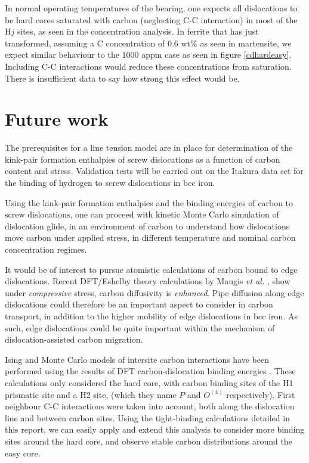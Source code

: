 \documentclass[a4paper,11pt]{article}
\begin{document}
In normal operating temperatures of the bearing, one expects all dislocations to be hard cores
saturated with carbon (neglecting C-C interaction) in most of the \(\text{H}j\) sites, as seen in
the concentration analysis. In ferrite that has just transformed, assuming a C concentration of
0.6 wt\% as seen in martensite, we expect similar behaviour to the 1000 appm case as seen in
figure \ref{cdhardeasy}. Including C-C interactions would reduce these concentrations from
saturation. There is insufficient data to say how strong this effect would be.



\section{Future work}
\label{sec:org74cf1cf}

The prerequisites for a line tension model are in place for determination of the kink-pair
formation enthalpies of screw dislocations as a function of carbon content and stress. Validation
tests will be carried out on the Itakura data set for the binding of hydrogen to screw
dislocations in bcc iron. 


Using the kink-pair formation enthalpies and the binding energies of carbon to screw dislocations, one can proceed
with kinetic Monte Carlo simulation of dislocation glide, in an environment of carbon to
understand how dislocations move carbon under applied stress, in different temperature
and nominal carbon concentration regimes.


It would be of interest to pursue atomistic calculations of carbon bound to edge
dislocations. Recent DFT/Eshelby theory calculations by Maugis \emph{et al.} \cite{Maugis2020}, show
under \emph{compressive} stress, carbon diffusivity is \emph{enhanced}. Pipe diffusion along edge
dislocations could therefore be an important aspect to consider in carbon transport, in addition
to the higher mobility of edge dislocations in bcc iron. As such, edge dislocations could be quite
important within the mechanism of dislocation-assisted carbon migration.

Ising and Monte Carlo models of intersite carbon interactions have been performed using the
results of DFT carbon-dislocation binding energies \cite{Lthi2019}.  These calculations only
considered the hard core, with carbon binding sites of the H1 prismatic site and a H2 site, (which
they name \(P\) and \(O^{(4)}\) respectively). First neighbour C-C interactions were taken
into account, both along the dislocation line and between carbon sites. Using the tight-binding
calculations detailed in this report, we can easily apply and extend this analysis to consider more
binding sites around the hard core, and observe stable carbon distributions around the easy core.
\end{document}
